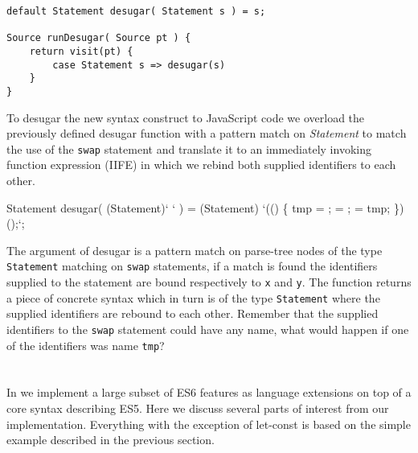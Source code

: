 \begin{lstlisting}[caption=Desugar visitor, language=rascal]
default Statement desugar( Statement s ) = s;

Source runDesugar( Source pt ) {
	return visit(pt) {
		case Statement s => desugar(s)
	}
}
\end{lstlisting}

To desugar the new syntax construct to JavaScript code we overload the previously defined desugar function with a pattern match on 
\textit{Statement} to match the use of the \lstinline$swap$ statement and translate it to an immediately invoking function expression (IIFE) in which we rebind both supplied identifiers to each other.


\begin{rascal}
Statement desugar( (Statement)`  ` )
    = (Statement)
            `(() \{{}
            	 tmp = ;
            	 = ;
            	 = tmp;
            \}{})();`;
\end{rascal}

The argument of desugar is a pattern match on parse-tree nodes of the type \lstinline$Statement$ matching on \lstinline$swap$ statements, if a match is found the identifiers supplied to the statement are bound respectively to \lstinline$x$ and \lstinline$y$. The function returns a piece of concrete syntax which in turn is of the type \lstinline$Statement$ where the supplied identifiers are rebound to each other. Remember that the supplied identifiers to the \lstinline$swap$ statement could have any name, what would happen if one of the identifiers was name \lstinline$tmp$?

\section{\projectname}
In \textit{\projectname} we implement a large subset of ES6 features as language extensions on top of a core syntax describing ES5. Here we discuss several parts of interest from our implementation. Everything with the exception of let-const is based on the simple example described in the previous section. 

